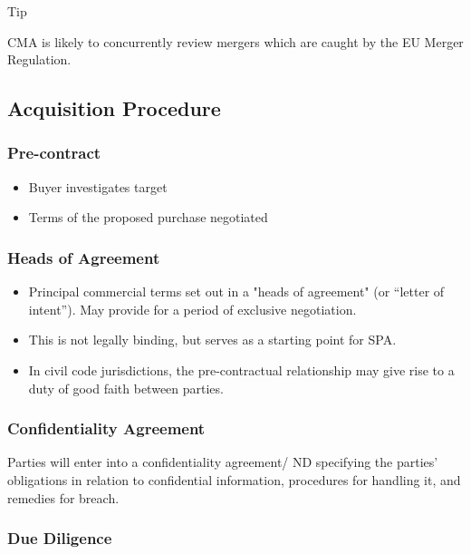 \documentclass[
]{article}
\providecommand{\tightlist}{%
  \setlength{\itemsep}{0pt}\setlength{\parskip}{0pt}}
\begin{document}
Tip

CMA is likely to concurrently review mergers which are caught by the EU
Merger Regulation.

\hypertarget{acquisition-procedure}{%
\subsection{Acquisition Procedure}\label{acquisition-procedure}}

\hypertarget{pre-contract}{%
\subsubsection{Pre-contract}\label{pre-contract}}

\begin{itemize}
\tightlist
\item
  Buyer investigates target
\item
  Terms of the proposed purchase negotiated
\end{itemize}

\hypertarget{heads-of-agreement}{%
\subsubsection{Heads of Agreement}\label{heads-of-agreement}}

\begin{itemize}
\tightlist
\item
  Principal commercial terms set out in a "heads of agreement" (or
  ``letter of intent''). May provide for a period of exclusive
  negotiation.
\item
  This is not legally binding, but serves as a starting point for SPA.
\item
  In civil code jurisdictions, the pre-contractual relationship may give
  rise to a duty of good faith between parties.
\end{itemize}

\hypertarget{confidentiality-agreement}{%
\subsubsection{Confidentiality
Agreement}\label{confidentiality-agreement}}

Parties will enter into a confidentiality agreement/ ND specifying the
parties' obligations in relation to confidential information, procedures
for handling it, and remedies for breach.

\hypertarget{due-diligence}{%
\subsubsection{Due Diligence}\label{due-diligence}}
\end{document}
